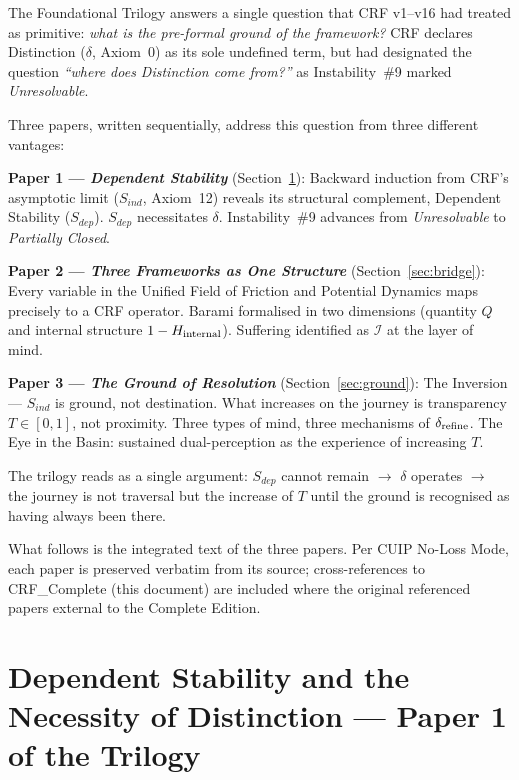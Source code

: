 \documentclass[12pt, a4paper]{article}
\begin{document}
The Foundational Trilogy answers a single question that CRF v1--v16 had treated
as primitive: \textit{what is the pre-formal ground of the framework?} CRF
declares Distinction ($\delta$, Axiom~0) as its sole undefined term, but had
designated the question \emph{``where does Distinction come from?''} as
Instability~\#9 marked \textit{Unresolvable}.

Three papers, written sequentially, address this question from three different
vantages:

\begin{formalbox}[title={The Trilogy Structure}]
\textbf{Paper 1 --- \textit{Dependent Stability}} (Section~\ref{sec:depstab}):
Backward induction from CRF's asymptotic limit ($S_{ind}$, Axiom~12) reveals its
structural complement, Dependent Stability ($S_{dep}$). $S_{dep}$ necessitates
$\delta$. Instability~\#9 advances from \emph{Unresolvable} to \emph{Partially Closed}.

\medskip
\textbf{Paper 2 --- \textit{Three Frameworks as One Structure}} (Section~\ref{sec:bridge}):
Every variable in the Unified Field of Friction and Potential Dynamics maps
precisely to a CRF operator. Barami formalised in two dimensions
(quantity $Q$ and internal structure $1 - H_{\rm internal}$). Suffering
identified as $\mathcal{I}$ at the layer of mind.

\medskip
\textbf{Paper 3 --- \textit{The Ground of Resolution}} (Section~\ref{sec:ground}):
The Inversion --- $S_{ind}$ is ground, not destination. What increases on the
journey is transparency $T \in [0,1]$, not proximity. Three types of mind, three
mechanisms of $\delta_{\rm refine}$. The Eye in the Basin: sustained dual-perception
as the experience of increasing $T$.
\end{formalbox}

The trilogy reads as a single argument: $S_{dep}$ cannot remain $\to$ $\delta$
operates $\to$ the journey is not traversal but the increase of $T$ until the
ground is recognised as having always been there.

What follows is the integrated text of the three papers. Per CUIP No-Loss Mode,
each paper is preserved verbatim from its source; cross-references to
CRF\_Complete (this document) are included where the original referenced papers
external to the Complete Edition.



\section{Dependent Stability and the Necessity of Distinction --- Paper 1 of the Trilogy}
\label{sec:depstab}
\end{document}
